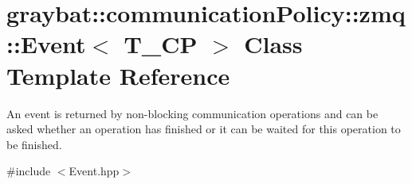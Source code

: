 \hypertarget{classgraybat_1_1communicationPolicy_1_1zmq_1_1Event}{}\section{graybat\+:\+:communication\+Policy\+:\+:zmq\+:\+:Event$<$ T\+\_\+\+C\+P $>$ Class Template Reference}
\label{classgraybat_1_1communicationPolicy_1_1zmq_1_1Event}


An event is returned by non-\/blocking communication operations and can be asked whether an operation has finished or it can be waited for this operation to be finished.  




{\ttfamily \#include $<$Event.\+hpp$>$}


